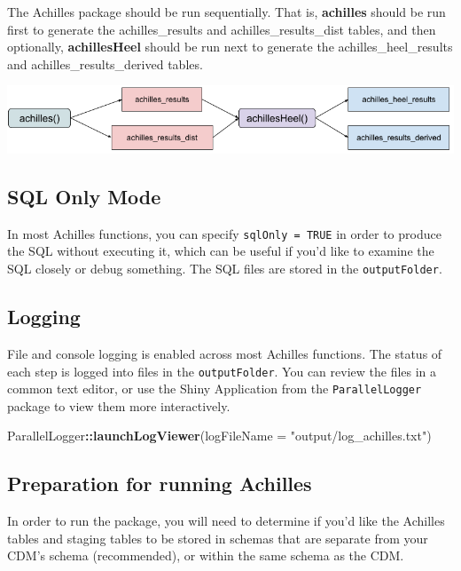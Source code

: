 \documentclass[]{article}
\newenvironment{Shaded}{\begin{snugshade}}{\end{snugshade}}
\newcommand{\KeywordTok}[1]{\textcolor[rgb]{0.13,0.29,0.53}{\textbf{#1}}}
\newcommand{\DataTypeTok}[1]{\textcolor[rgb]{0.13,0.29,0.53}{#1}}
\newcommand{\StringTok}[1]{\textcolor[rgb]{0.31,0.60,0.02}{#1}}
\newcommand{\OperatorTok}[1]{\textcolor[rgb]{0.81,0.36,0.00}{\textbf{#1}}}
\newcommand{\NormalTok}[1]{#1}
\begin{document}
The Achilles package should be run sequentially. That is,
\textbf{achilles} should be run first to generate the achilles\_results
and achilles\_results\_dist tables, and then optionally,
\textbf{achillesHeel} should be run next to generate the
achilles\_heel\_results and achilles\_results\_derived tables.

\includegraphics{../inst/doc/achilles_flowchart.png}

\subsection{SQL Only Mode}\label{sql-only-mode}

In most Achilles functions, you can specify \texttt{sqlOnly\ =\ TRUE} in
order to produce the SQL without executing it, which can be useful if
you'd like to examine the SQL closely or debug something. The SQL files
are stored in the \texttt{outputFolder}.

\subsection{Logging}\label{logging}

File and console logging is enabled across most Achilles functions. The
status of each step is logged into files in the \texttt{outputFolder}.
You can review the files in a common text editor, or use the Shiny
Application from the \texttt{ParallelLogger} package to view them more
interactively.

\begin{Shaded}
\begin{Highlighting}[]
\NormalTok{ParallelLogger}\OperatorTok{::}\KeywordTok{launchLogViewer}\NormalTok{(}\DataTypeTok{logFileName =} \StringTok{"output/log_achilles.txt"}\NormalTok{)}
\end{Highlighting}
\end{Shaded}

\subsection{Preparation for running
Achilles}\label{preparation-for-running-achilles}

In order to run the package, you will need to determine if you'd like
the Achilles tables and staging tables to be stored in schemas that are
separate from your CDM's schema (recommended), or within the same schema
as the CDM.
\end{document}
